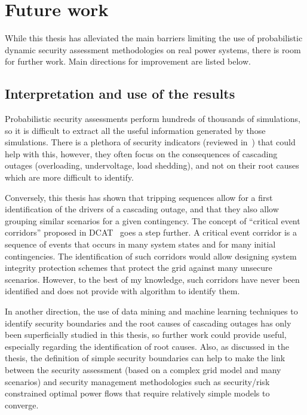 \section{Future work}

While this thesis has alleviated the main barriers limiting the use of probabilistic dynamic security assessment methodologies on real power systems, there is room for further work. Main directions for improvement are listed below.

\subsection*{Interpretation and use of the results}

Probabilistic security assessments perform hundreds of thousands of simulations, so it is difficult to extract all the useful information generated by those simulations. There is a plethora of security indicators (reviewed in~\cite{cypressD11}) that could help with this, however, they often focus on the consequences of cascading outages (overloading, undervoltage, load shedding), and not on their root causes which are more difficult to identify.

Conversely, this thesis has shown that tripping sequences allow for a first identification of the drivers of a cascading outage, and that they also allow grouping similar scenarios for a given contingency. The concept of ``critical event corridors'' proposed in DCAT~\cite{DCATphase1} goes a step further. A critical event corridor is a sequence of events that occurs in many system states and for many initial contingencies. The identification of such corridors would allow designing system integrity protection schemes that protect the grid against many unsecure scenarios. However, to the best of my knowledge, such corridors have never been identified and \cite{DCATphase1} does not provide with algorithm to identify them.

In another direction, the use of data mining and machine learning techniques to identify security boundaries and the root causes of cascading outages has only been superficially studied in this thesis, so further work could provide useful, especially regarding the identification of root causes. Also, as discussed in the thesis, the definition of simple security boundaries can help to make the link between the security assessment (based on a complex grid model and many scenarios) and security management methodologies such as security/risk constrained optimal power flows that require relatively simple models to converge.

